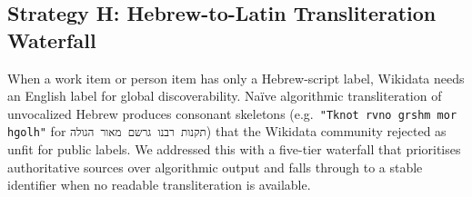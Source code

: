 \documentclass[Afour,sageh,times]{sagej}
\newcommand{\code}[1]{\texttt{#1}}
\begin{document}
\subsection{Strategy H: Hebrew-to-Latin Transliteration Waterfall}
\label{sec:translit-waterfall}

When a work item or person item has only a Hebrew-script label, Wikidata needs an English label for global discoverability. Naïve algorithmic transliteration of unvocalized Hebrew produces consonant skeletons (e.g.~\code{"Tknot rvno grshm mor hgolh"} for \code{תקנות רבנו גרשם מאור הגולה}) that the Wikidata community rejected as unfit for public labels. We addressed this with a five-tier waterfall that prioritises authoritative sources over algorithmic output and falls through to a stable identifier when no readable transliteration is available.
\end{document}
